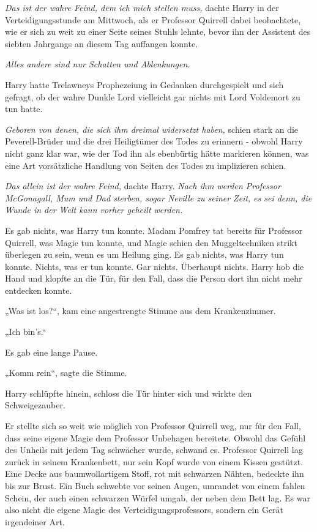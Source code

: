 {\emph{Das ist der wahre Feind, dem ich mich stellen muss,} dachte Harry in der Verteidigungsstunde am Mittwoch, als er Professor Quirrell dabei beobachtete, wie er sich zu weit zu einer Seite seines Stuhls lehnte, bevor ihn der Assistent des siebten Jahrgangs an diesem Tag auffangen konnte.

\emph{Alles andere sind nur Schatten und Ablenkungen.}

Harry hatte Trelawneys Prophezeiung in Gedanken durchgespielt und sich gefragt, ob der wahre Dunkle Lord vielleicht gar nichts mit Lord Voldemort zu tun hatte.

\emph{Geboren von denen, die sich ihm dreimal widersetzt haben,} schien stark an die Peverell-Brüder und die drei Heiligtümer des Todes zu erinnern - obwohl Harry nicht ganz klar war, wie der Tod ihn als ebenbürtig hätte markieren können, was eine Art vorsätzliche Handlung von Seiten des Todes zu implizieren schien.

\emph{Das allein ist der wahre Feind,} dachte Harry. \emph{Nach ihm werden Professor McGonagall, Mum und Dad sterben, sogar Neville zu seiner Zeit,} \emph{es sei denn, die Wunde in der Welt kann vorher geheilt werden.}

Es gab nichts, was Harry tun konnte. Madam Pomfrey tat bereits für Professor Quirrell, was Magie tun konnte, und Magie schien den Muggeltechniken strikt überlegen zu sein, wenn es um Heilung ging. Es gab nichts, was Harry tun konnte. Nichts, was er tun konnte. Gar nichts. Überhaupt nichts. Harry hob die Hand und klopfte an die Tür, für den Fall, dass die Person dort ihn nicht mehr entdecken konnte.

„Was ist los?“, kam eine angestrengte Stimme aus dem Krankenzimmer.

„Ich bin's.“

Es gab eine lange Pause.

„Komm rein“, sagte die Stimme.

Harry schlüpfte hinein, schloss die Tür hinter sich und wirkte den Schweigezauber.

Er stellte sich so weit wie möglich von Professor Quirrell weg, nur für den Fall, dass seine eigene Magie dem Professor Unbehagen bereitete. Obwohl das Gefühl des Unheils mit jedem Tag schwächer wurde, schwand es. Professor Quirrell lag zurück in seinem Krankenbett, nur sein Kopf wurde von einem Kissen gestützt. Eine Decke aus baumwollartigem Stoff, rot mit schwarzen Nähten, bedeckte ihn bis zur Brust. Ein Buch schwebte vor seinen Augen, umrandet von einem fahlen Schein, der auch einen schwarzen Würfel umgab, der neben dem Bett lag. Es war also nicht die eigene Magie des Verteidigungsprofessors, sondern ein Gerät irgendeiner Art.

}
